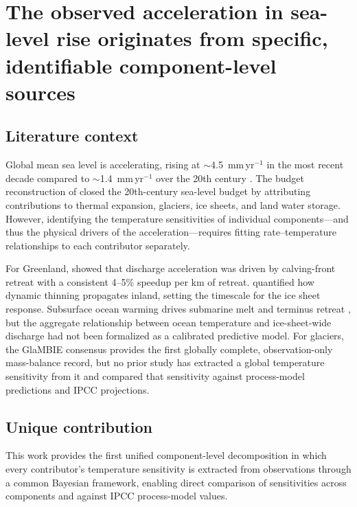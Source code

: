 \documentclass[11pt]{article}
\begin{document}
\section{The observed acceleration in sea-level rise originates from specific, identifiable component-level sources}
\label{sec:takeaway_components}

\subsection{Literature context}

Global mean sea level is accelerating, rising at $\sim$4.5~mm\,yr$^{-1}$ in the most recent decade compared to $\sim$1.4~mm\,yr$^{-1}$ over the 20th century \citep{Frederikse2020, Hamlington2020}. The budget reconstruction of \citet{Frederikse2020} closed the 20th-century sea-level budget by attributing contributions to thermal expansion, glaciers, ice sheets, and land water storage. However, identifying the temperature sensitivities of individual components---and thus the physical drivers of the acceleration---requires fitting rate--temperature relationships to each contributor separately.

For Greenland, \citet{King2020} showed that discharge acceleration was driven by calving-front retreat with a consistent 4--5\% speedup per km of retreat. \citet{Felikson2017} quantified how dynamic thinning propagates inland, setting the timescale for the ice sheet response. Subsurface ocean warming drives submarine melt and terminus retreat \citep{Straneo2013, Holland2008, Xu2013, Rignot2016, Jackson2022}, but the aggregate relationship between ocean temperature and ice-sheet-wide discharge had not been formalized as a calibrated predictive model. For glaciers, the GlaMBIE consensus \citep{GlaMBIE2024} provides the first globally complete, observation-only mass-balance record, but no prior study has extracted a global temperature sensitivity from it and compared that sensitivity against process-model predictions \citep{Rounce2023} and IPCC projections.

\subsection{Unique contribution}

This work provides the first unified component-level decomposition in which every contributor's temperature sensitivity is extracted from observations through a common Bayesian framework, enabling direct comparison of sensitivities across components and against IPCC process-model values.
\end{document}
